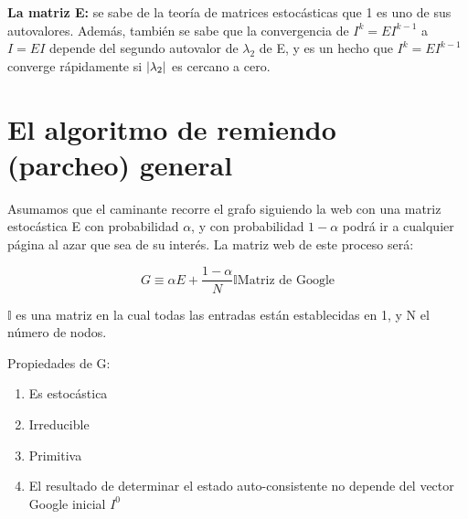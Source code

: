 \textbf{La matriz E:} se sabe de la teoría de matrices estocásticas que 1 es uno de sus autovalores. Además, también se sabe que la convergencia de $I^k = E I^{k-1}$ a $I = E I$ depende del segundo autovalor de $\lambda_2$ de E, y es un hecho que $I^k = E I^{k-1}$ converge rápidamente si $\abs{\lambda_2}$ es
cercano a cero.

\section{El algoritmo de remiendo (parcheo) general}

Asumamos que el caminante recorre el grafo siguiendo la web con una matriz estocástica E con probabilidad $\alpha$, y con probabilidad $1-\alpha$ podrá ir a cualquier página al azar que sea de su interés. La matriz web de este proceso será:

\[
G \equiv \alpha E + \frac{1-\alpha}{N} \mathds{I} \text{Matriz de Google}
\]

$\mathds{I}$ es una matriz en la cual todas las entradas están establecidas en 1, y N el número de nodos.

Propiedades de G:
\begin{enumerate}
\item Es estocástica
\item Irreducible
\item Primitiva
\item El resultado de determinar el estado auto-consistente no depende del vector Google inicial $I^0$
\end{enumerate}

